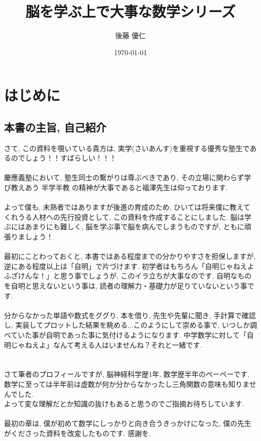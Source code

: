 \documentclass[11pt,a4paper]{jsarticle}
\title{脳を学ぶ上で大事な数学シリーズ}
\author{後藤 優仁}
\date{\today}
\begin{document}
\maketitle
%
%
\section{はじめに}
\subsection{本書の主旨, 自己紹介}
さて, この資料を覗いている貴方は, 実学(さいあんす)を重視する優秀な塾生であるのでしょう！！すばらしい！！！\\
\\
慶應義塾において, 塾生同士の繋がりは尊ぶべきであり, その立場に関わらず学び教えあう 半学半教 の精神が大事であると福澤先生は仰っております. \\
\\
よって僕も, 未熟者ではありますが後進の育成のため, ひいては将来僕に教えてくれうる人材への先行投資として, この資料を作成することにしました. 脳は学ぶにはあまりにも難しく, 脳を学ぶ事で脳を病んでしまうものですが, ともに頑張りましょう！ \\
\\
最初にことわっておくと, 本書ではある程度までの分かりやすさを担保しますが, 逆にある程度以上は「自明」で片づけます. 初学者はもちろん「自明じゃねえよふざけんな！」と思う事でしょうが, このイラ立ちが大事なのです. 自明なものを自明と思えないという事は, 読者の理解力・基礎力が足りていないという事です. \\\\
分からなかった単語や数式をググり, 本を借り, 先生や先輩に聞き, 手計算で確認し, 実装してプロットした結果を眺める...このようにして崇める事で, いつしか調べていた事が自明であった事に気付けるようになります. 中学数学に対して「自明じゃねえよ」なんて考える人はいませんね？それと一緒です.\\
\\
\\
さて筆者のプロフィールですが, 脳神経科学歴1年, 数学歴半年のペーペーです. 数学に至っては半年前は虚数が何か分からなかったし三角関数の意味も知りませんでした.\\
よって変な理解だとか知識の抜けもあると思うのでご指摘お待ちしています.\\
\\
最初の章は, 僕が初めて数学にしっかりと向き合うきっかけになった, 僕の先生がくださった資料を改変したものです. 感謝を.\\
\end{document}
